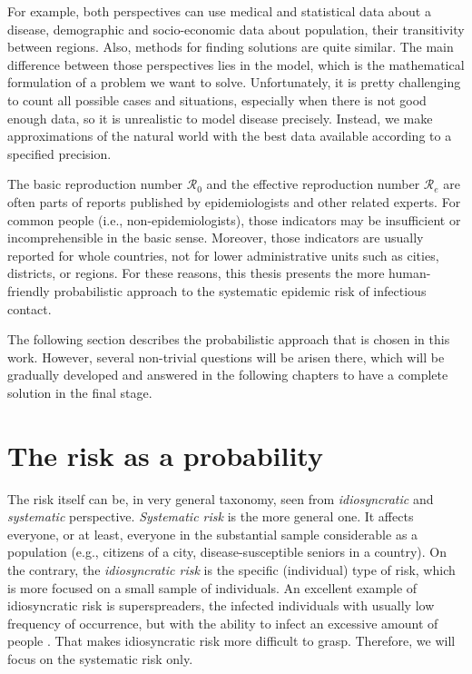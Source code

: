\documentclass[
  digital, %
  oneside, %
  lof,     %
  lot,     %
]{fithesis4}
\begin{document}
For example, both perspectives can use medical and statistical data about a disease, demographic and socio-economic data about population, their transitivity between regions. 
Also, methods for finding solutions are quite similar. 
The main difference between those perspectives lies in the model, which is the mathematical formulation of a problem we want to solve. 
Unfortunately, it is pretty challenging to count all possible cases and situations, especially when there is not good enough data, so it is unrealistic to model disease precisely. 
Instead, we make approximations of the natural world with the best data available according to a specified precision.

The basic reproduction number $\mathcal{R}_0$ and the effective reproduction number $\mathcal{R}_e$ are often parts of reports published by epidemiologists and other related experts.
For common people (i.e., non-epidemiologists), those indicators may be insufficient or incomprehensible in the basic sense.
Moreover, those indicators are usually reported for whole countries, not for lower administrative units such as cities, districts, or regions. 
For these reasons, this thesis presents the more human-friendly probabilistic approach to the systematic epidemic risk of infectious contact.

The following section describes the probabilistic approach that is chosen in this work. 
However, several non-trivial questions will be arisen there, which will be gradually developed and answered in the following chapters to have a complete solution in the final stage.


\chapter{The risk as a probability}
\label{chap:risk-as-probability}

The risk itself can be, in very general taxonomy, seen from \textit{idiosyncratic} and \textit{systematic} perspective.
\textit{Systematic risk} is the more general one. It affects everyone, or at least, everyone in the substantial sample considerable as a population (e.g., citizens of a city, disease-susceptible seniors in a country).
On the contrary, the \textit{idiosyncratic risk} is the specific (individual) type of risk, which is more focused on a small sample of individuals.
An excellent example of idiosyncratic risk is superspreaders, the infected individuals with usually low frequency of occurrence, but with the ability to infect an excessive amount of people \cite[Chapter~4]{brauer2008}.
That makes idiosyncratic risk more difficult to grasp.
Therefore, we will focus on the systematic risk only.
\end{document}
